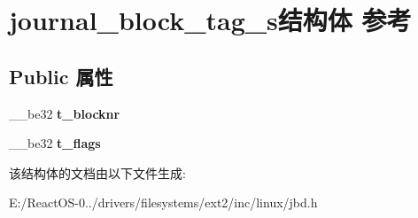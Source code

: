 \hypertarget{structjournal__block__tag__s}{}\section{journal\+\_\+block\+\_\+tag\+\_\+s结构体 参考}
\label{structjournal__block__tag__s}
\subsection*{Public 属性}
\begin{DoxyCompactItemize}
\item 
\mbox{\label{structjournal__block__tag__s_a4577d85eebb12c6f7208bc3d8fa17f2e}} 
\+\_\+\+\_\+be32 {\bfseries t\+\_\+blocknr}
\item 
\mbox{\label{structjournal__block__tag__s_ac84b2fe8a98c3131ac3984317ecf6e4b}} 
\+\_\+\+\_\+be32 {\bfseries t\+\_\+flags}
\end{DoxyCompactItemize}


该结构体的文档由以下文件生成\+:\begin{DoxyCompactItemize}
\item 
E\+:/\+React\+O\+S-\/0../drivers/filesystems/ext2/inc/linux/jbd.\+h\end{DoxyCompactItemize}

